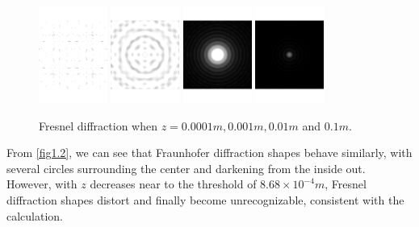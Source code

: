 \documentclass[fontsize=11pt]{scrartcl}
\begin{document}
\begin{figure}[H]
    \centering
     \includegraphics[width=0.20\textwidth]{img/1_Fre_-4.bmp.pdf}
     \includegraphics[width=0.20\textwidth]{img/1_Fre_-3.bmp.pdf}
     \includegraphics[width=0.20\textwidth]{img/1_Fre_-2.bmp.pdf}
     \includegraphics[width=0.20\textwidth]{img/1_Fre_-1.bmp.pdf}
     \caption{Fresnel diffraction when $z = 0.0001m, 0.001m, 0.01m$ and $0.1m$.}
     \label{fig1.3}
\end{figure}
From \ref{fig1.2}, we can see that Fraunhofer diffraction shapes  
behave similarly, with several circles surrounding the center and darkening
from the inside out. However, with $z$ decreases near to the threshold of 
$8.68 \times 10^{-4}m$, Fresnel diffraction
shapes distort and finally become unrecognizable, consistent with the calculation.
\end{document}
